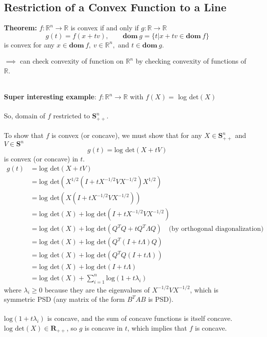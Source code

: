 \documentclass[]{article}
\newcommand{\R}{\mathbb{R}}
\newcommand{\Rn}{\mathbb{R}^{n}}
\newcommand{\Rpp}{\boldsymbol{R}_{++}}
\newcommand{\Sn}{\boldsymbol{S}^{n}}
\newcommand{\Snpp}{\boldsymbol{S}^{n}_{++}}
\begin{document}
\subsection*{Restriction of a Convex Function to a Line\\}
\begin{tcolorbox}
\textbf{Theorem:} $f:\Rn\rightarrow\R$ is convex if and only if $g:\R\rightarrow\R$ $$g(t)=f(x+tv), \qquad \textbf{dom}\:g=\{t|x+tv\in\textbf{dom}\:f\}$$ is convex for any $x\in\textbf{dom}\:f,\ v\in\Rn,$ and $t\in\textbf{dom}\ g.$
\end{tcolorbox}
$\implies$ can check convexity of function on $\Rn$ by checking convexity of functions of $\R$.
\\\\
\begin{tcolorbox}
\textbf{Super interesting example}: $f:\Rn\rightarrow\R$ with $f(X)=$ log det$(X)$
\\\\
So, domain of $f$ restricted to $\Snpp$.
\\\\
To show that $f$ is convex (or concave), we must show that for any $X\in\Snpp$ and $V\in\Sn$ $$ g(t) = \text{log det}(X+tV)$$ is convex (or concave) in $t$.
\begin{align*}
g(t) &= \text{log det}(X+tV) \\
&= \text{log det}(X^{1/2}(I+tX^{-1/2}VX^{-1/2})X^{1/2}) \\
&= \text{log det}(X(I+tX^{-1/2}VX^{-1/2})) \\
&= \text{log det}(X) + \text{log det}(I+tX^{-1/2}VX^{-1/2}) \\
&= \text{log det}(X) + \text{log det}(Q^{T}Q+tQ^{T}\Lambda Q) \quad\text{(by orthogonal diagonalization)} \\
&= \text{log det}(X) + \text{log det}(Q^{T}(I+t\Lambda)Q) \\
&= \text{log det}(X) + \text{log det}(Q^{T}Q(I+t\Lambda)) \\
&= \text{log det}(X) + \text{log det}(I+t\Lambda) \\
&= \text{log det}(X) + \sum_{i=1}^{n} \text{log}(1+t\lambda_{i})
\end{align*}
where $\lambda_{i} \geq 0$ because they are the eigenvalues of $X^{-1/2}VX^{-1/2}$, which is symmetric PSD (any matrix of the form $B^{T}AB$ is PSD).
\\\\
$\text{log}(1+t\lambda_{i})$ is concave, and the sum of concave functions is itself concave. $\text{log det}(X) \in \Rpp$, so $g$ is concave in $t$, which implies that $f$ is concave.
\end{tcolorbox}
\end{document}

